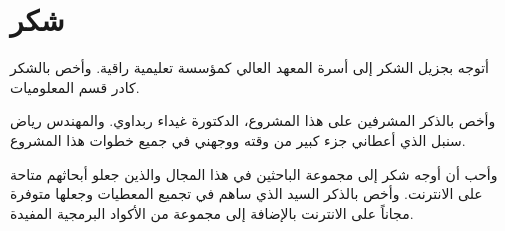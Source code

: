

\chapter*{شكر}
أتوجه بجزيل الشكر إلى أسرة المعهد العالي كمؤسسة تعليمية راقية.
وأخص بالشكر كادر قسم المعلوميات.

وأخص بالذكر المشرفين على هذا المشروع، الدكتورة غيداء ربداوي.
والمهندس رياض سنبل الذي أعطاني جزء كبير من وقته ووجهني في جميع خطوات هذا المشروع.

وأحب أن أوجه شكر إلى مجموعة الباحثين في هذا المجال والذين جعلو أبحاثهم متاحة على الانترنت.
وأخص بالذكر السيد  الذي ساهم في تجميع المعطيات وجعلها متوفرة مجاناً على الانترنت بالإضافة إلى مجموعة من الأكواد البرمجية المفيدة.
